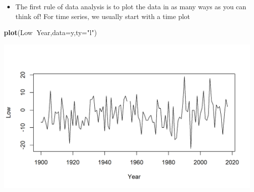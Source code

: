 \documentclass[]{article}
\newenvironment{Shaded}{\begin{snugshade}}{\end{snugshade}}
\newcommand{\KeywordTok}[1]{\textcolor[rgb]{0.13,0.29,0.53}{\textbf{#1}}}
\newcommand{\DataTypeTok}[1]{\textcolor[rgb]{0.13,0.29,0.53}{#1}}
\newcommand{\StringTok}[1]{\textcolor[rgb]{0.31,0.60,0.02}{#1}}
\newcommand{\OperatorTok}[1]{\textcolor[rgb]{0.81,0.36,0.00}{\textbf{#1}}}
\newcommand{\NormalTok}[1]{#1}
\providecommand{\tightlist}{%
  \setlength{\itemsep}{0pt}\setlength{\parskip}{0pt}}
\begin{document}
\begin{itemize}
\tightlist
\item
  The first rule of data analysis is to plot the data in as many ways as
  you can think of! For time series, we usually start with a time plot
\end{itemize}

\begin{Shaded}
\begin{Highlighting}[]
\KeywordTok{plot}\NormalTok{(Low}\OperatorTok{~}\NormalTok{Year,}\DataTypeTok{data=}\NormalTok{y,}\DataTypeTok{ty=}\StringTok{"l"}\NormalTok{)}
\end{Highlighting}
\end{Shaded}

\begin{center}\includegraphics{figure/intro-weather_plot-1} \end{center}
\end{document}
